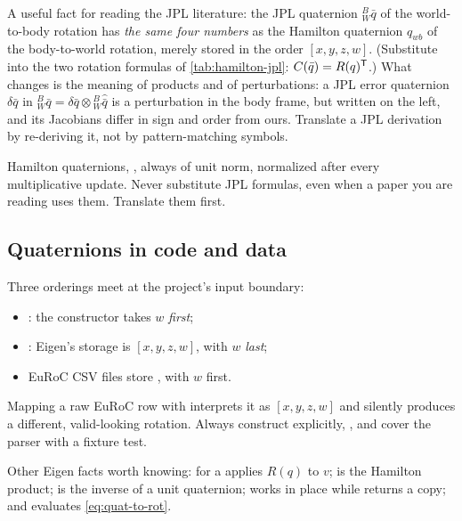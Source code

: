 A useful fact for reading the JPL literature: the JPL quaternion ${}^B_W\bar q$ of the world-to-body rotation has \emph{the same four numbers} as the
Hamilton quaternion $q_{wb}$ of the body-to-world rotation, merely stored in the order $[x, y, z, w]$. (Substitute into the two rotation formulas of
\cref{tab:hamilton-jpl}: $C(\bar q) = R(q)^{\mathsf{T}}$.) What changes is the meaning of products and of perturbations: a JPL error quaternion
$\delta\bar q$ in ${}^B_W\bar q = \delta\bar q\otimes{}^B_W\hat{\bar q}$ is a perturbation in the body frame, but written on the left, and its Jacobians differ in sign
and order from ours. Translate a JPL derivation by re-deriving it, not by pattern-matching symbols.

\begin{convention}
Hamilton quaternions, , always of unit norm, normalized after every multiplicative update. Never substitute JPL
formulas, even when a paper you are reading uses them. Translate them first.
\end{convention}

\subsection{Quaternions in code and data}

\begin{pitfall}
Three orderings meet at the project's input boundary:
\begin{itemize}
  \item {}: the constructor takes $w$ \emph{first};
  \item {}: Eigen's storage is $[x, y, z, w]$, with $w$ \emph{last};
  \item EuRoC CSV files store , with $w$ first.
\end{itemize}
Mapping a raw EuRoC row with  interprets it as $[x,y,z,w]$ and silently produces a different, valid-looking
rotation. Always construct explicitly, , and cover the parser with a fixture test.
\end{pitfall}

Other Eigen facts worth knowing:  for a  applies $R(q)$ to $v$;  is the Hamilton product;
 is the inverse of a unit quaternion;  works in place while  returns a copy; and
 evaluates \eqref{eq:quat-to-rot}.


